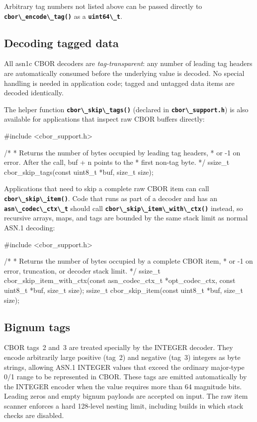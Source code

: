 \documentclass[english,oneside,12pt]{book}
\newcommand{\code}[1]{\texttt{\textbf{\lstinline{#1}}}}
\begin{document}
Arbitrary tag numbers not listed above can be passed directly to
\code{cbor\_encode\_tag()} as a \code{uint64\_t}.

\subsection*{Decoding tagged data}

All asn1c CBOR decoders are \emph{tag-transparent}: any number of leading
tag headers are automatically consumed before the underlying value is decoded.
No special handling is needed in application code; tagged and untagged data
items are decoded identically.

The helper function \code{cbor\_skip\_tags()} (declared in
\code{cbor\_support.h}) is also available for applications that inspect raw
CBOR buffers directly:

\begin{codesample}
#include <cbor_support.h>

/*
 * Returns the number of bytes occupied by leading tag headers,
 * or -1 on error.  After the call, buf + n points to the
 * first non-tag byte.
 */
ssize_t cbor_skip_tags(const uint8_t *buf, size_t size);
\end{codesample}

Applications that need to skip a complete raw CBOR item can call
\code{cbor\_skip\_item()}.  Code that runs as part of a decoder and has an
\code{asn\_codec\_ctx\_t} should call \code{cbor\_skip\_item\_with\_ctx()}
instead, so recursive arrays, maps, and tags are bounded by the same stack
limit as normal ASN.1 decoding:

\begin{codesample}
#include <cbor_support.h>

/*
 * Returns the number of bytes occupied by a complete CBOR item,
 * or -1 on error, truncation, or decoder stack limit.
 */
ssize_t cbor_skip_item_with_ctx(const asn_codec_ctx_t *opt_codec_ctx,
                                const uint8_t *buf, size_t size);
ssize_t cbor_skip_item(const uint8_t *buf, size_t size);
\end{codesample}

\subsection*{Bignum tags}

CBOR tags~2 and~3 are treated specially by the INTEGER decoder.
They encode arbitrarily large positive (tag~2) and negative (tag~3)
integers as byte strings, allowing ASN.1 INTEGER values that exceed the
ordinary major-type 0/1 range to be represented in CBOR. These tags are emitted
automatically by the INTEGER encoder when the value requires more than
64 magnitude bits. Leading zeros and empty bignum payloads are accepted
on input. The raw item scanner enforces a hard 128-level nesting limit,
including builds in which stack checks are disabled.
\end{document}
